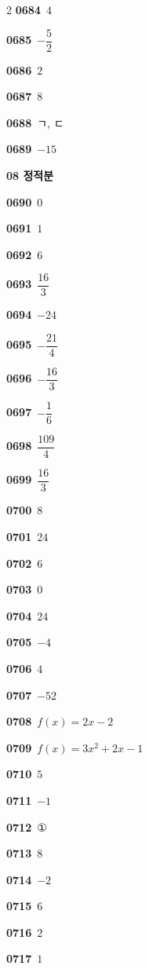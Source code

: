 \documentclass[10pt,a4paper]{article}
\begin{document}
\begin{multicols}{2}
\noindent\textbf{0684}\ $4$\par
\noindent\textbf{0685}\ $-\dfrac{5}{2}$\par
\noindent\textbf{0686}\ $2$\par
\noindent\textbf{0687}\ $8$\par
\noindent\textbf{0688}\ ㄱ, ㄷ\par
\noindent\textbf{0689}\ $-15$\par
\noindent\textbf{08 정적분}\par\smallskip
\noindent\textbf{0690}\ $0$\par
\noindent\textbf{0691}\ $1$\par
\noindent\textbf{0692}\ $6$\par
\noindent\textbf{0693}\ $\dfrac{16}{3}$\par
\noindent\textbf{0694}\ $-24$\par
\noindent\textbf{0695}\ $-\dfrac{21}{4}$\par
\noindent\textbf{0696}\ $-\dfrac{16}{3}$\par
\noindent\textbf{0697}\ $-\dfrac{1}{6}$\par
\noindent\textbf{0698}\ $\dfrac{109}{4}$\par
\noindent\textbf{0699}\ $\dfrac{16}{3}$\par
\noindent\textbf{0700}\ $8$\par
\noindent\textbf{0701}\ $24$\par
\noindent\textbf{0702}\ $6$\par
\noindent\textbf{0703}\ $0$\par
\noindent\textbf{0704}\ $24$\par
\noindent\textbf{0705}\ $-4$\par
\noindent\textbf{0706}\ $4$\par
\noindent\textbf{0707}\ $-52$\par
\noindent\textbf{0708}\ $f(x)=2x-2$\par
\noindent\textbf{0709}\ $f(x)=3x^2+2x-1$\par
\noindent\textbf{0710}\ $5$\par
\noindent\textbf{0711}\ $-1$\par
\noindent\textbf{0712}\ ①\par
\noindent\textbf{0713}\ $8$\par
\noindent\textbf{0714}\ $-2$\par
\noindent\textbf{0715}\ $6$\par
\noindent\textbf{0716}\ $2$\par
\noindent\textbf{0717}\ $1$\par

\end{multicols}
\end{document}
